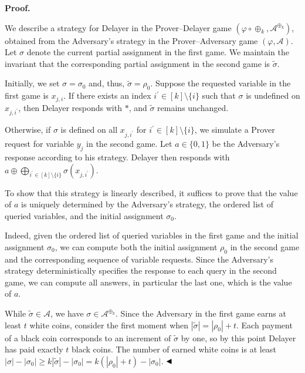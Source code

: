 \par\medskip\noindent\textbf{Proof.}\par


We describe a strategy for Delayer in the Prover–Delayer game $(\varphi\circ\oplus_{k},\mathcal{A}^{\oplus_{k}})$, obtained from the Adversary’s strategy in the Prover–Adversary game
$(\varphi,\mathcal{A})$.
Let $\sigma$ denote the current partial assignment in the first game.
We maintain the invariant that the corresponding partial assignment in the second game is
$\tilde{\sigma}$.\par



Initially, we set $\sigma=\sigma_{0}$ and, thus, $\tilde{\sigma}=\rho_{0}$.
Suppose the requested variable in the first game is $x_{j,i}$.
If there exists an index $i^{\prime}\in[k]\setminus\{i\}$ such that $\sigma$ is undefined on
$x_{j,i^{\prime}}$, then Delayer responds with $*$, and $\tilde{\sigma}$ remains unchanged.\par



Otherwise, if $\sigma$ is defined on all $x_{j,i^{\prime}}$ for $i^{\prime}\in[k]\setminus\{i\}$,
we simulate a Prover request for variable $y_{j}$ in the second game.
Let $a\in\{0,1\}$ be the Adversary’s response according to his strategy.
Delayer then responds with $a\oplus\bigoplus_{i^{\prime}\in[k]\setminus\{i\}}\sigma(x_{j,i^{\prime}})$.\par



To show that this strategy is linearly described, it suffices to prove that the value of $a$
is uniquely determined by the Adversary’s strategy, the ordered list of queried variables,
and the initial assignment $\sigma_{0}$.\par



Indeed, given the ordered list of queried variables in the first game and the initial assignment
$\sigma_{0}$, we can compute both the initial assignment $\rho_{0}$ in the second game and
the corresponding sequence of variable requests.
Since the Adversary’s strategy deterministically specifies the response to each query in
the second game, we can compute all answers, in particular the last one, which is the value of $a$.\par



While $\tilde{\sigma}\in\mathcal{A}$, we have $\sigma\in\mathcal{A}^{\oplus_{k}}$.
Since the Adversary in the first game earns at least $t$ white coins, consider the first
moment when $|\tilde{\sigma}|=|\rho_{0}|+t$.
Each payment of a black coin corresponds to an increment of $\tilde{\sigma}$ by one,
so by this point Delayer has paid exactly $t$ black coins.
The number of earned white coins is at least $|\sigma|-|\sigma_{0}|\geq k|\tilde{\sigma}|-|\sigma_{0}|=k(|\rho_{0}|+t)-|\sigma_{0}|$.
$\hfill\blacktriangleleft$\par


